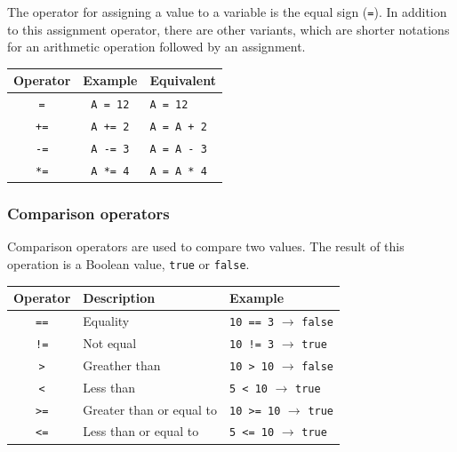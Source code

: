\documentclass[11pt,fleqn]{book} %
\begin{document}
The operator for assigning a value to a variable is the equal sign (\texttt{=}). In addition to this assignment operator, there are other variants, which are shorter notations for an arithmetic operation followed by an assignment.

\begin{center}
	\begin{tabular}{c c l}
		\toprule
		\textbf{Operator} & \textbf{Example}                     & \textbf{Equivalent}           \\ \midrule
		\texttt{=} & \texttt{A = 12} & \texttt{A = 12}\\
		\texttt{+=} & \texttt{A += 2} & \texttt{A = A + 2} \\
		\texttt{-=} & \texttt{A -= 3} & \texttt{A = A - 3} \\
		\texttt{*=} & \texttt{A *= 4} & \texttt{A = A * 4} \\
		\bottomrule
	\end{tabular}
\end{center}


\subsubsection{Comparison operators}
Comparison operators are used to compare two values. The result of this operation is a Boolean value, \texttt{true} or \texttt{false}.

\begin{center}
	\begin{tabular}{c l l}
		\toprule
		\textbf{Operator} & \textbf{Description}     & \textbf{Example}                                     \\ \midrule
		   \texttt{==}    & Equality                  & \texttt{10 == 3} $\rightarrow$ \texttt{false} \\
		   \texttt{!=}    & Not equal                 & \texttt{10 != 3} $\rightarrow$ \texttt{true}  \\
		   \texttt{>}     & Greather than             & \texttt{10 > 10} $\rightarrow$ \texttt{false} \\
		   \texttt{<}     & Less than                 & \texttt{5 < 10} $\rightarrow$ \texttt{true}   \\
		   \texttt{>=}    & Greater than or equal to  & \texttt{10 >= 10} $\rightarrow$ \texttt{true} \\
		   \texttt{<=}    & Less than or equal to     & \texttt{5 <= 10} $\rightarrow$ \texttt{true}  \\ \bottomrule
	\end{tabular}
\end{center}
\end{document}
